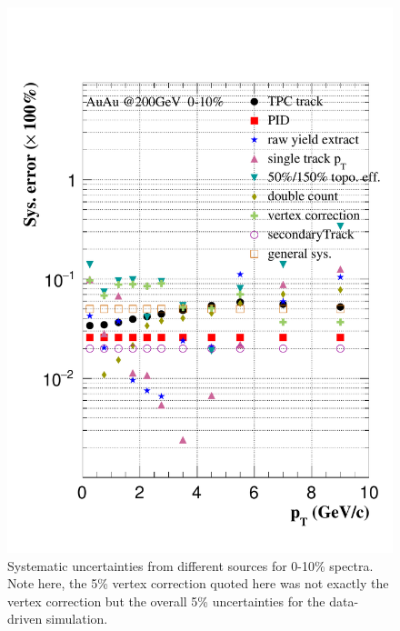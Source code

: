 \begin{figure}[htbp]
\begin{minipage}[htbp]{0.47\linewidth}
\centering
\includegraphics[width=1.0\textwidth,angle=0]{figure/Run14_D0HFT/sysErr_0_10_2.pdf}
\caption{ Systematic uncertainties from different sources for 0-10\% spectra. Note here, the 5\% vertex correction quoted here was not exactly the vertex correction but the overall 5\% uncertainties for the data-driven simulation. \label{sysErr_0_10}}
\end{minipage}
\hfill
\begin{minipage}[htbp]{0.47\linewidth}
\centering

\end{minipage}
\end{figure}
